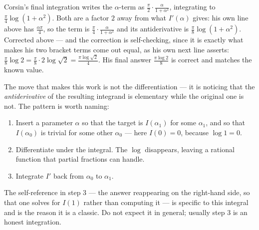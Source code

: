 \begin{ainote}
Corsin's final integration writes the $\alpha$-term as
$\tfrac{\pi}{2}\cdot\tfrac{\alpha}{1+\alpha^2}$, integrating to $\tfrac{\pi}{4}\log(1+\alpha^2)$.
Both are a factor $2$ away from what $I'(\alpha)$ gives: his own line above has
$\tfrac{\alpha\pi}{4}$, so the term is $\tfrac{\pi}{4}\cdot\tfrac{\alpha}{1+\alpha^2}$ and its
antiderivative is $\tfrac{\pi}{8}\log(1+\alpha^2)$. Corrected above --- and the correction is
self-checking, since it is exactly what makes his two bracket terms come out equal, as his own
next line asserts:
$\tfrac{\pi}{8}\log 2 = \tfrac{\pi}{8}\cdot 2\log\sqrt2 = \tfrac{\pi\log\sqrt2}{4}$. His final
answer $\tfrac{\pi\log 2}{8}$ is correct and matches the known value.
\end{ainote}

\begin{ainote}
The move that makes this work is not the differentiation --- it is noticing that the
\emph{antiderivative} of the resulting integrand is elementary while the original one is not.
The pattern is worth naming:
\begin{enumerate}[label=\textbf{\arabic*.}]
  \item Insert a parameter $\alpha$ so that the target is $I(\alpha_1)$ for some
    $\alpha_1$, and so that $I(\alpha_0)$ is trivial for some other $\alpha_0$ --- here
    $I(0)=0$, because $\log 1 = 0$.
  \item Differentiate under the integral. The $\log$ disappears, leaving a rational function
    that partial fractions can handle.
  \item Integrate $I'$ back from $\alpha_0$ to $\alpha_1$.
\end{enumerate}
The self-reference in step 3 --- the answer reappearing on the right-hand side, so that one
solves for $I(1)$ rather than computing it --- is specific to this integral and is the reason it
is a classic. Do not expect it in general; usually step 3 is an honest integration.
\end{ainote}
